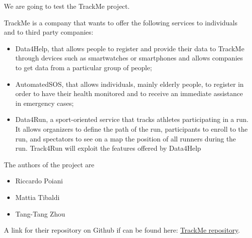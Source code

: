 We are going to test the TrackMe project.

\noindent 
TrackMe is a company that wants to offer the following services to individuals and to third party companies:
\begin{itemize}

\item Data4Help, that allows people to register and provide their data to TrackMe through devices such as smartwatches or smartphones and allows companies to get data from a particular group of people;

\item AutomatedSOS, that allows individuals, mainly elderly people, to register in order to have their health monitored and to receive an immediate assistance in emergency cases;

\item Data4Run, a sport-oriented service that tracks athletes participating in a run. It allows organizers to define the path of the run, participants to enroll to the run, and spectators to see on a map the position of all runners during the run. Track4Run will exploit the features offered by Data4Help
\end{itemize}


\noindent The authors of the project are
\begin{itemize}
    \item Riccardo Poiani
    \item Mattia Tibaldi
    \item Tang-Tang Zhou
\end{itemize}

\noindent A link for their repository on Github if can be found here: \href{https://github.com/tangtang95/PoianiTibaldiZhou}{TrackMe repository}.